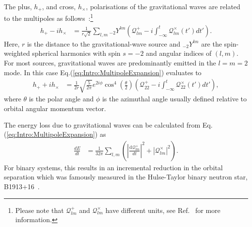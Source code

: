 \documentclass[../Thesis.tex]{subfiles}
\begin{document}
    The plus, $h_{+}$, and cross, $h_{\times}$, polarisations of the gravitational waves are related to the multipoles as follows~\cite{Moncrief1974,Abrahams1996,Andrade1999,Nagar2005,Baiotti2008}:\footnote{Please note that $\mathcal{Q}^+_{lm}$ and $\mathcal{Q}^\times_{lm}$ have different units, see Ref.~\cite{Nagar2005} for more information.}
     \begin{align}
        h_{+} - i h_{\times} & = \frac{1}{r\sqrt{2}}\sum_{l,m} {}_{-2}Y^{lm}\left(\mathcal{Q}^{+}_{lm} -i \int_{-\infty}^t\mathcal{Q}^\times_{lm}(t')dt'\right). \label{eq:Intro:MultipoleExpansion}
    \end{align}   
    Here, $r$ is the distance to the gravitational-wave source and ${}_{-2}Y^{lm}$ are the spin-weighted spherical harmonics with spin $s=-2$ and angular indices of $(l,m)$.
    For most sources, gravitational waves are predominantly emitted in the $l=m=2$ mode. 
    In this case Eq.(\ref{eq:Intro:MultipoleExpansion}) evaluates to
     \begin{align}
        h_{+} + i h_{\times} & = \frac{1}{2 r} \sqrt{\frac{5}{2\pi }} e^{2 i \phi } \cos ^4\left(\frac{\theta }{2}\right)\left(\mathcal{Q}^{+}_{22} -i \int_{-\infty}^t\mathcal{Q}^\times_{22}(t')dt'\right), \label{eq:Intro:MultipoleExpansionlm22}
    \end{align}
    where  $\theta$ is the polar angle and $\phi$ is the azimuthal angle usually defined relative to orbital angular momentum vector. \par
    
    The energy loss due to gravitational waves can be calculated from Eq.(\ref{eq:Intro:MultipoleExpansion}) as~\cite{Nagar2005}
     \begin{align}
        \frac{dE}{dt} & = \frac{1}{32 \pi}\sum_{l,m} \left(\left|\frac{\mathrm{d} \mathcal{Q}^{+}_{lm}}{dt}\right|^2 + \left|\mathcal{Q}^\times_{lm}\right|^2\right). \label{eq:Intro:EnergyLoss}
    \end{align}
    For binary systems, this results in an incremental reduction in the orbital separation which was famously measured in the Hulse-Taylor binary neutron star, B1913+16~\cite{Hulse1975,Taylor1982,Weisberg2016}. \par 
    
\end{document}
